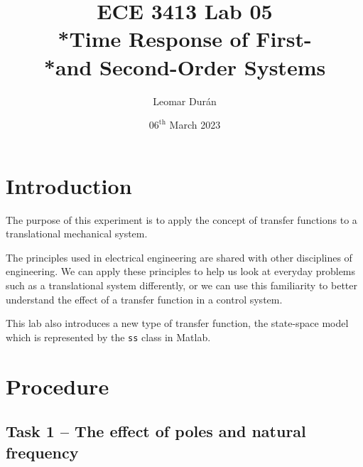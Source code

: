 \documentclass[12pt]{article}
\title{ECE 3413 Lab 05\\*Time Response of First-\\*and Second-Order Systems}
\author{Leomar Dur\'an}
\date{${06}^{\text{th}}$ March 2023}
\begin{document}
\maketitle
\newpage

\section{Introduction}

The purpose of this experiment is to apply the concept of transfer functions to a translational mechanical system.

The principles used in electrical engineering are shared with other disciplines of engineering.
We can apply these principles to help us look at everyday problems such as a translational system differently,
or we can use this familiarity to better understand the effect of a transfer function in a control system.

This lab also introduces a new type of transfer function, the state-space model which is represented by the \texttt{ss} class in Matlab.

\section{Procedure}

\subsection{Task 1 -- The effect of poles and natural frequency}
\end{document}
